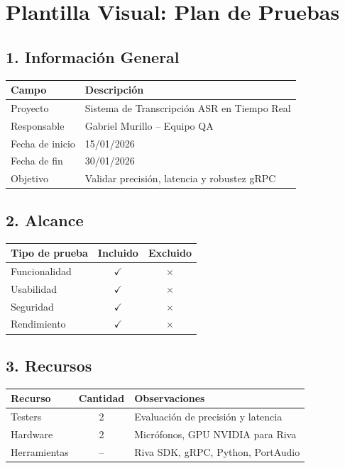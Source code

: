 \documentclass[12pt,a4paper]{article}
\begin{document}
\section{Plantilla Visual: Plan de Pruebas}

\subsection{1. Información General}
\begin{table}[h!]
\centering
\begin{tabular}{|l|l|}
\hline
\rowcolor{headergrey} \textbf{Campo} & \textbf{Descripción} \\ \hline
Proyecto & Sistema de Transcripción ASR en Tiempo Real \\ \hline
Responsable & Gabriel Murillo -- Equipo QA \\ \hline
Fecha de inicio & 15/01/2026 \\ \hline
Fecha de fin & 30/01/2026 \\ \hline
Objetivo & Validar precisión, latencia y robustez gRPC \\ \hline
\end{tabular}
\end{table}

\subsection{2. Alcance}
\begin{table}[h!]
\centering
\begin{tabular}{|l|c|c|}
\hline
\rowcolor{headergrey} \textbf{Tipo de prueba} & \textbf{Incluido} & \textbf{Excluido} \\ \hline
Funcionalidad & \cellcolor{statusgreen} $\checkmark$ & $\times$ \\ \hline
Usabilidad & \cellcolor{statusgreen} $\checkmark$ & $\times$ \\ \hline
Seguridad & \cellcolor{statusgreen} $\checkmark$ & $\times$ \\ \hline
Rendimiento & \cellcolor{statusgreen} $\checkmark$ & $\times$ \\ \hline
\end{tabular}
\end{table}

\subsection{3. Recursos}
\begin{table}[h!]
\centering
\begin{tabular}{|l|c|l|}
\hline
\rowcolor{headergrey} \textbf{Recurso} & \textbf{Cantidad} & \textbf{Observaciones} \\ \hline
Testers & 2 & Evaluación de precisión y latencia \\ \hline
Hardware & 2 & Micrófonos, GPU NVIDIA para Riva \\ \hline
Herramientas & -- & Riva SDK, gRPC, Python, PortAudio \\ \hline
\end{tabular}
\end{table}
\end{document}
